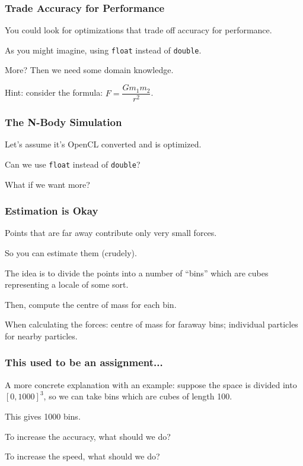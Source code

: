 \begin{frame}
\frametitle{Trade Accuracy for Performance}

You could look for optimizations that trade off accuracy for performance. 

As you might imagine, using \texttt{float} instead of \texttt{double}.


More? Then we need some domain knowledge. 

Hint: consider the formula: $F = \dfrac{Gm_{1}m_{2}}{r^{2}}$. 

\end{frame}



\begin{frame}
\frametitle{The N-Body Simulation}

Let's assume it's OpenCL converted and is optimized.

Can we use \texttt{float} instead of \texttt{double}?

What if we want more?

\end{frame}


\begin{frame}
\frametitle{Estimation is Okay}

Points that are far away contribute only very small forces. 

So you can estimate them (crudely). 

The idea is to divide the points into a number of ``bins'' which are cubes representing a locale of some sort. 

Then, compute the centre of mass for each bin. 

When calculating the forces: centre of mass for faraway bins; individual particles for nearby particles.


\end{frame}

\begin{frame}
\frametitle{This used to be an assignment... }

A more concrete explanation with an example: suppose the space is divided into $[0, 1000]^3$, so we can take bins which are cubes of length 100. 

This gives 1000 bins. 

To increase the accuracy, what should we do?

To increase the speed, what should we do?

\end{frame}


